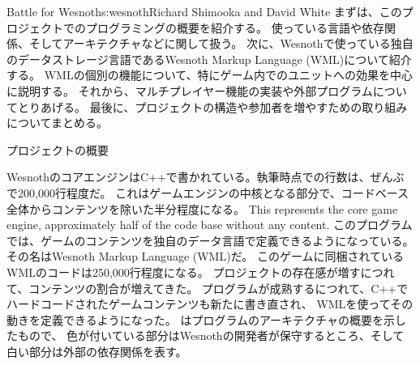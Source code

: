 \begin{aosachapter}{Battle for Wesnoth}{s:wesnoth}{Richard Shimooka and David White}
まずは、このプロジェクトでのプログラミングの概要を紹介する。
使っている言語や依存関係、そしてアーキテクチャなどに関して扱う。
次に、Wesnothで使っている独自のデータストレージ言語であるWesnoth Markup Language (WML)について紹介する。
WMLの個別の機能について、特にゲーム内でのユニットへの効果を中心に説明する。
それから、マルチプレイヤー機能の実装や外部プログラムについてとりあげる。
最後に、プロジェクトの構造や参加者を増やすための取り組みについてまとめる。

\begin{aosasect1}{プロジェクトの概要}

WesnothのコアエンジンはC++で書かれている。執筆時点での行数は、ぜんぶで200,000行程度だ。
これはゲームエンジンの中核となる部分で、コードベース全体からコンテンツを除いた半分程度になる。
This represents the core game engine, approximately half of the code base without any content.
このプログラムでは、ゲームのコンテンツを独自のデータ言語で定義できるようになっている。
その名はWesnoth Markup Language (WML)だ。
このゲームに同梱されているWMLのコードは250,000行程度になる。
プロジェクトの存在感が増すにつれて、コンテンツの割合が増えてきた。
プログラムが成熟するにつれて、C++でハードコードされたゲームコンテンツも新たに書き直され、
WMLを使ってその動きを定義できるようになった。
はプログラムのアーキテクチャの概要を示したもので、
色が付いている部分はWesnothの開発者が保守するところ、そして白い部分は外部の依存関係を表す。


\end{aosasect1}
\end{aosachapter}
